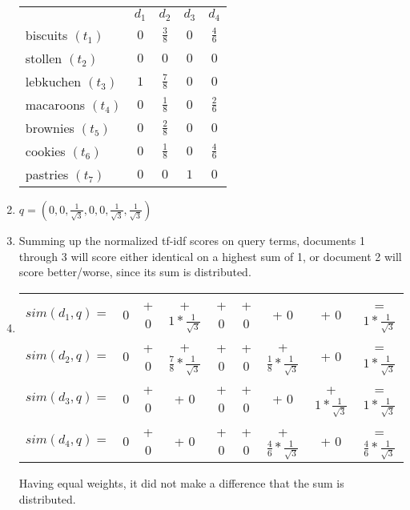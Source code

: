 \documentclass[10pt,a4paper]{article}
\begin{document}
\begin{enumerate}
\begin{tabular}[t]{lcccc}
             & $d_1$&$d_2$&$d_3$&$d_4$ \\
            biscuits $(t_1)$    & $0$&$\frac{3}{8}$&$0$&$\frac{4}{6}$ \\
            stollen $(t_2)$    & $0$&$0$&$0$&$0$ \\
            lebkuchen $(t_3)$    & $1$&$\frac{7}{8}$&$0$&$0$ \\
            macaroons $(t_4)$    & $0$&$\frac{1}{8}$&$0$&$\frac{2}{6}$ \\
            brownies $(t_5)$    & $0$&$\frac{2}{8}$&$0$&$0$ \\
            cookies $(t_6)$    & $0$&$\frac{1}{8}$&$0$&$\frac{4}{6}$ \\
            pastries $(t_7)$    & $0$&$0$&$1$&$0$ \\
        \end{tabular}
    \item $q=(0,0,\frac{1}{\sqrt{3}},0,0,\frac{1}{\sqrt{3}},\frac{1}{\sqrt{3}})$
    \item Summing up the normalized tf-idf scores on query terms, documents 1 through 3 will score either identical on a highest sum of 1, or document 2 will score better/worse, since its sum is distributed.
    \item \begin{tabular}[t]{ccccccccc}
            $sim(d_1,q)=$&0&+ 0&+ $1*\frac{1}{\sqrt{3}}$&+ 0&+ 0&+ 0&+ 0&= $1*\frac{1}{\sqrt{3}}$\\
            $sim(d_2,q)=$&0&+ 0&+ $\frac{7}{8}*\frac{1}{\sqrt{3}}$&+ 0&+ 0&+ $\frac{1}{8}*\frac{1}{\sqrt{3}}$&+ 0&= $1*\frac{1}{\sqrt{3}}$\\
            $sim(d_3,q)=$&0&+ 0&+ 0&+ 0&+ 0&+ 0&+ $1*\frac{1}{\sqrt{3}}$&= $1*\frac{1}{\sqrt{3}}$\\
            $sim(d_4,q)=$&0&+ 0&+ 0&+ 0&+ 0&+ $\frac{4}{6}*\frac{1}{\sqrt{3}}$&+ 0&= $\frac{4}{6}*\frac{1}{\sqrt{3}}$
        \end{tabular}
        
        Having equal weights, it did not make a difference that the sum is distributed.
\end{enumerate}
\end{document}
